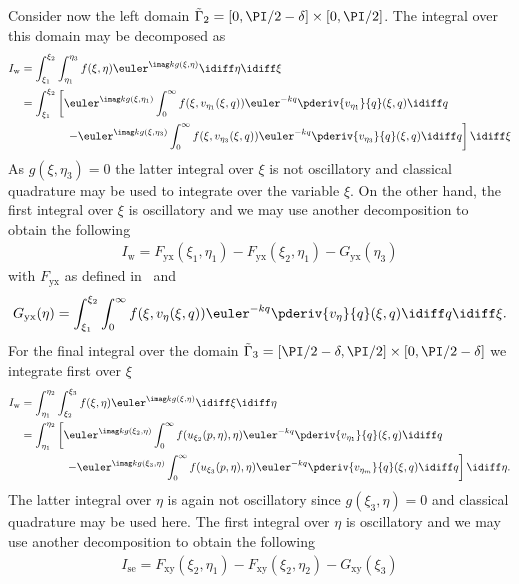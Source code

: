 Consider now the left domain $\tilde{\Gamma}_2=[0,\PI/2-\delta]\times [0,\PI/2]$. The integral over this domain may be decomposed as
\begin{align*}
	I_{\mathrm{w}} &= \int_{\xi_1}^{\xi_2}\int_{\eta_1}^{\eta_3} f(\xi,\eta)\euler^{\imag k g(\xi,\eta)}\idiff\eta\idiff \xi\\
	&=\int_{\xi_1}^{\xi_2}\left[\euler^{\imag k g(\xi,\eta_1)}\int_0^\infty f(\xi,v_{\eta_1}(\xi,q))\euler^{-k q}\pderiv{v_{\eta_1}}{q}(\xi,q)\idiff q\right.\\
	&{\hskip4em\relax}\left. -\euler^{\imag k g(\xi,\eta_3)}\int_0^\infty f(\xi,v_{\eta_3}(\xi,q))\euler^{-k q}\pderiv{v_{\eta_3}}{q}(\xi,q)\idiff q\right]\idiff \xi
\end{align*}
As $g(\xi,\eta_3)=0$ the latter integral over $\xi$ is not oscillatory and classical quadrature may be used to integrate over the variable $\xi$. On the other hand, the first integral over $\xi$ is oscillatory and we may use another decomposition to obtain the following
\begin{align*}
	I_{\mathrm{w}} = F_{\mathrm{yx}}(\xi_1,\eta_1) - F_{\mathrm{yx}}(\xi_2,\eta_1) -G_{\mathrm{yx}}(\eta_3)
\end{align*}
with $F_{\mathrm{yx}}$ as defined in~ and 
\begin{equation*}
	G_{\mathrm{yx}}(\eta) = \int_{\xi_1}^{\xi_2}\int_0^\infty f(\xi,v_{\eta}(\xi,q))\euler^{-k q}\pderiv{v_{\eta}}{q}(\xi,q)\idiff q\idiff \xi.
\end{equation*}
For the final integral over the domain $\tilde{\Gamma}_3=[\PI/2-\delta,\PI/2]\times [0,\PI/2-\delta]$ we integrate first over $\xi$ 
\begin{align*}
	I_{\mathrm{w}} &= \int_{\eta_1}^{\eta_2}\int_{\xi_2}^{\xi_3} f(\xi,\eta)\euler^{\imag k g(\xi,\eta)}\idiff\xi\idiff \eta\\
	&=\int_{\eta_1}^{\eta_2}\left[\euler^{\imag k g(\xi_2,\eta)}\int_0^\infty f(u_{\xi_2}(p,\eta),\eta)\euler^{-k q}\pderiv{v_{\eta_1}}{q}(\xi,q)\idiff q\right.\\
	&{\hskip4em\relax}\left. -\euler^{\imag k g(\xi_3,\eta)}\int_0^\infty f(u_{\xi_3}(p,\eta),\eta)\euler^{-k q}\pderiv{v_{\eta_m}}{q}(\xi,q)\idiff q\right]\idiff \eta.
\end{align*}
The latter integral over $\eta$ is again not oscillatory since $g(\xi_3,\eta)=0$ and classical quadrature may be used here. The first integral over $\eta$ is oscillatory and we may use another decomposition to obtain the following
\begin{align*}
	I_{\mathrm{se}} = F_{\mathrm{xy}}(\xi_2,\eta_1) - F_{\mathrm{xy}}(\xi_2,\eta_2) -G_{\mathrm{xy}}(\xi_3)
\end{align*}
